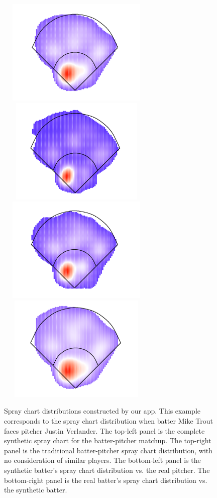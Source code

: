 \documentclass[11pt]{article}
\begin{document}
\begin{figure}
\centering
    \includegraphics[width=3in, height=2in]{trout_verlander_master.png}
    \includegraphics[width=3in, height=2in]{trout_traditional.png}
    \includegraphics[width=3in, height=2in]{synthetic_trout.png}
    \includegraphics[width=3in, height=2in]{synthetic_verlander.png}    
    \caption{Spray chart distributions constructed by our app.  This example 
    corresponds to the spray chart distribution when batter Mike Trout faces 
    pitcher Justin Verlander.
    The top-left panel is the complete synthetic spray chart for 
      the batter-pitcher matchup.
    The top-right panel is the traditional batter-pitcher spray chart 
      distribution, with no consideration of similar players.
    The bottom-left panel is the synthetic batter's spray chart distribution 
      vs. the real pitcher. 
    The bottom-right panel is the real batter's spray chart distribution 
      vs. the synthetic batter.}
    \label{spraydists}
\end{figure}
\end{document}
